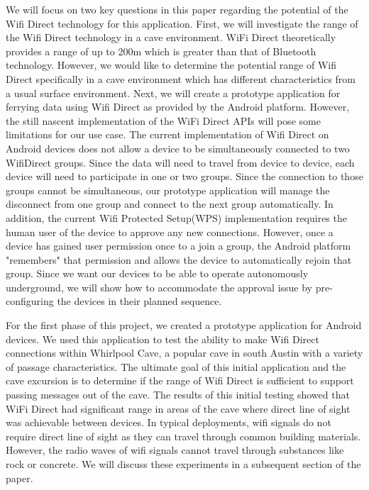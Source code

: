 \documentclass[10pt,twocolumn]{article}
\begin{document}
We will focus on two key questions in this paper regarding the potential of the Wifi Direct technology for this application.
First, we will investigate the range of the Wifi Direct technology in a cave environment.
WiFi Direct theoretically provides a range of up to 200m which is greater than that of Bluetooth technology. 
However, we would like to determine the potential range of Wifi Direct specifically in a cave environment which has different characteristics from a usual surface environment. 
Next, we will create a prototype application for ferrying data using Wifi Direct as provided by the Android platform. 
However, the still nascent implementation of the WiFi Direct APIs will pose some limitations for our use case.
The current implementation of Wifi Direct on Android devices does not allow a device to be simultaneously connected to two WifiDirect groups.
Since the data will need to travel from device to device, each device will need to participate in one or two groups. 
Since the connection to those groups cannot be simultaneous, our prototype application will manage the disconnect from one group and connect to the next group automatically.
In addition, the current Wifi Protected Setup(WPS) implementation requires the human user of the device to approve any new connections.
However, once a device has gained user permission once to a join a group, the Android platform "remembers" that permission and allows the device to automatically rejoin that group.
Since we want our devices to be able to operate autonomously underground, we will show how to accommodate the approval issue by pre-configuring the devices in their planned sequence.
 
For the first phase of this project, we created a prototype application for Android devices. 
We used this application to test the ability to make Wifi Direct connections within Whirlpool Cave, a popular cave in south Austin with a variety of passage characteristics. 
The ultimate goal of this initial application and the cave excursion is to determine if the range of Wifi Direct is sufficient to support passing messages out of the cave.
The results of this initial testing showed that WiFi Direct had significant range in areas of the cave where direct line of sight was achievable between devices.
In typical deployments, wifi signals do not require direct line of sight as they can travel through common building materials.
However, the radio waves of wifi signals cannot travel through substances like rock or concrete.
We will discuss these experiments in a subsequent section of the paper.
\end{document}
